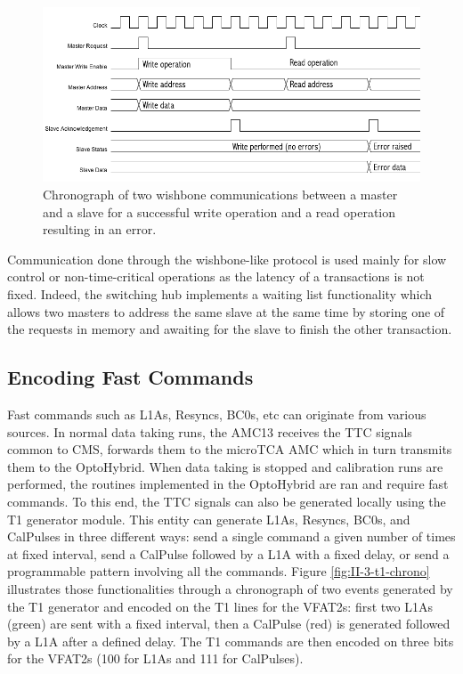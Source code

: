       \begin{figure}[h!]
        \centering
        \includegraphics[width=\textwidth]{img/II-3-test-beam/wishbone-chrono.png}
        \caption{Chronograph of two wishbone communications between a master and a slave for a successful write operation and a read operation resulting in an error.}
        \label{fig:II-3-wishbone-chrono}
      \end{figure}

      Communication done through the wishbone-like protocol is used mainly for slow control or non-time-critical operations as the latency of a transactions is not fixed. Indeed, the switching hub implements a waiting list functionality which allows two masters to address the same slave at the same time by storing one of the requests in memory and awaiting for the slave to finish the other transaction.

    \subsection{Encoding Fast Commands}

      Fast commands such as L1As, Resyncs, BC0s, etc can originate from various sources. In normal data taking runs, the AMC13 receives the TTC signals common to CMS, forwards them to the microTCA AMC which in turn transmits them to the OptoHybrid. When data taking is stopped and calibration runs are performed, the routines implemented in the OptoHybrid are ran and require fast commands. To this end, the TTC signals can also be generated locally using the T1 generator module. This entity can generate L1As, Resyncs, BC0s, and CalPulses in three different ways: send a single command a given number of times at fixed interval, send a CalPulse followed by a L1A with a fixed delay, or send a programmable pattern involving all the commands. Figure \ref{fig:II-3-t1-chrono} illustrates those functionalities through a chronograph of two events generated by the T1 generator and encoded on the T1 lines for the VFAT2s: first two L1As (green) are sent with a fixed interval, then a CalPulse (red) is generated followed by a L1A after a defined delay. The T1 commands are then encoded on three bits for the VFAT2s (100 for L1As and 111 for CalPulses). \\

